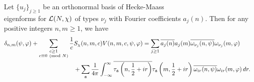     \begin{theorem}
      Let $\{u_{j}\}_{j \ge 1}$ be an orthonormal basis of Hecke-Maass \\ eigenforms for $\mathcal{L}(N,\chi)$ of types $\nu_{j}$ with Fourier coefficients $a_{j}(n)$. Then for any positive integers $n,m \ge 1$, we have
      \begin{align*}
        \delta_{n,m}(\psi,\varphi)+\sum_{\substack{c \ge 1 \\ c \equiv 0 \ \left(\text{mod }N\right)}}\frac{1}{c}&S_{\chi}(n,m,c)V(n,m,c,\psi,\varphi) = \sum_{j \ge 1}\overline{a_{j}(n)}a_{j}(m)\overline{\omega_{\nu_{j}}(n,\psi)}\omega_{\nu_{j}}(m,\varphi) \\
        &+\sum_{\mathfrak{a}}\frac{1}{4\pi}\int_{-\infty}^{\infty}\overline{\tau_{\mathfrak{a}}\left(n,\frac{1}{2}+ir\right)}\tau_{\mathfrak{a}}\left(m,\frac{1}{2}+ir\right)\overline{\omega_{ir}(n,\psi)}\omega_{ir}(m,\varphi)\,dr.
      \end{align*}
    \end{theorem} \fi